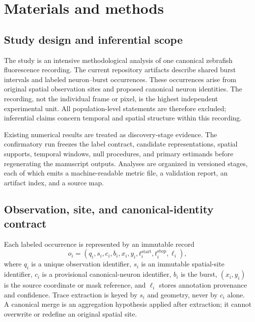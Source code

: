 \section{Materials and methods}
\label{sec:methods}

\subsection{Study design and inferential scope}

The study is an intensive methodological analysis of one canonical zebrafish fluorescence recording. The current repository artifacts describe \NCurrentBursts{} shared burst intervals and \NCurrentOccurrences{} labeled neuron--burst occurrences. These occurrences arise from \NCurrentOriginalSites{} original spatial observation sites and \NCurrentCanonicalNeurons{} proposed canonical neuron identities. The recording, not the individual frame or pixel, is the highest independent experimental unit. All population-level statements are therefore excluded; inferential claims concern temporal and spatial structure within this recording.

Existing numerical results are treated as discovery-stage evidence. The confirmatory run freezes the label contract, candidate representations, spatial supports, temporal windows, null procedures, and primary estimands before regenerating the manuscript outputs. Analyses are organized in versioned stages, each of which emits a machine-readable metric file, a validation report, an artifact index, and a source map.

\subsection{Observation, site, and canonical-identity contract}
\label{sec:identity-contract}

Each labeled occurrence is represented by an immutable record
\begin{equation}
  o_i = (q_i,s_i,c_i,b_i,x_i,y_i,t_i^{\mathrm{start}},t_i^{\mathrm{stop}},\ell_i),
\end{equation}
where $q_i$ is a unique observation identifier, $s_i$ is an immutable spatial-site identifier, $c_i$ is a provisional canonical-neuron identifier, $b_i$ is the burst, $(x_i,y_i)$ is the source coordinate or mask reference, and $\ell_i$ stores annotation provenance and confidence. Trace extraction is keyed by $s_i$ and geometry, never by $c_i$ alone. A canonical merge is an aggregation hypothesis applied after extraction; it cannot overwrite or redefine an original spatial site.

